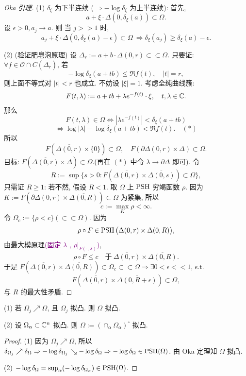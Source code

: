 \begin{proof}[Oka 引理]
    (1) $\delta _{\xi }$ 为下半连续 ($\Rightarrow -\log \delta _{\xi }$ 为上半连续): 
    首先, $$a+\xi \cdot  \Delta (0,\delta _{\xi }(a)) \subset \Omega .$$  
    设 $\epsilon >0, a_j \to a$. 
    则 当 $j>>1$ 时, 
    $$ a_j+\xi \cdot \Delta (0,\delta _{\xi }(a)-\epsilon ) \subset \Omega ~ \Rightarrow \delta _{\xi }(a_j) \geq \delta _{\xi }(a)-\epsilon .$$  

    (2) (验证肥皂泡原理) 设 $\Delta _r:=a+b \cdot \Delta (0,r) \subset \subset \Omega $. 
    只要证: $\forall f \in \mathcal{O} \cap C(\overline{\Delta} _r)$, 若 
    $$ -\log \delta _{\xi }(a+tb) \leq \Re f (t), \quad |t|=r, $$  
    则上面不等式对 $|t|<r$ 也成立. 
    不妨设 $|\xi |=1$. 考虑全纯曲线簇: 
    $$ F(t,\lambda ):=a+tb+\lambda  e^{-f(t)} \cdot  \xi , \quad t,\lambda \in {\mathbb C} .$$ 
    那么 
    $$ F(t,\lambda ) \in \Omega \iff \left| \lambda e^{-f(t)} \right| <\delta _{\xi }(a+tb)  $$
    $$\iff \log |\lambda |-\log \delta _{\xi }(a+tb)<\Re f(t). \quad (*) $$
    所以 
    $$ F \left(  \overline{\Delta (0,r)} \times \{0\} \right) \subset \Omega, \quad F \left( \partial \Delta (0,r) \times \Delta  \right) \subset \Omega .$$
    目标: $F \left( \overline{\Delta (0,r)} \times \Delta  \right) \subset \Omega $.(再在 $(*)$ 中令 $\lambda \to \partial \Delta $ 即可). 
    令 
    $$ R:=\sup \big\{s>0: F \left( \overline{\Delta (0,r) }\times \overline{\Delta (0,s)} \right)\subset \Omega \big\} ,$$
    只需证 $R \geq 1$:  若不然, 假设 $R<1$. 取 $\Omega $ 上 $\operatorname{PSH}$ 穷竭函数 $\rho $. 因为 $K:=F \left( \partial \Delta (0,r) \times \overline{\Delta (0,R)}   \right) \subset \Omega$ 为紧集, 所以 
    $$ c:=\max_{K} \rho <\infty . $$   
    令 $\Omega _c:=\{\rho <c\} (\subset \subset \Omega )$. 因为 
    $$ \rho \circ F \in \operatorname{PSH} \big( \Delta (0,r) \times \Delta (0,R) \big),$$   
    由最大模原理\textcolor{purple}{(固定 $\lambda $ , $\rho |_{F(\cdot ,\lambda )}$)}, 
    $$ \rho \circ F \leq c \quad \text{于}~  \overline{\Delta (0,r)} \times \overline{\Delta (0,R)} .$$
    于是 $F \left( \overline{\Delta (0,r)} \times \overline{\Delta (0,R)} \right) \subset \overline{\Omega}_c \subset \subset \Omega \Rightarrow \exists 0<\epsilon <<1$, s.t. $$F \left( \overline{\Delta (0,r)} \times \overline{\Delta (0,R+\epsilon )} \right) \subset \Omega,$$
     与 $R$ 的最大性矛盾.   
\end{proof}

\begin{corollary}
    (1) 若 $\Omega _j \nearrow \Omega $, 且 $\Omega _j$ 拟凸. 则 $\Omega $ 拟凸. 
    
    (2) 设 $\Omega _{\alpha } \subset {\mathbb C}^n$ 拟凸. 则 $\Omega :=\left( \cap _{\alpha } \Omega _{\alpha } \right)^{\circ }$ 拟凸.  
\end{corollary}
\begin{proof}
    (1) 因为 $\Omega _j \nearrow \Omega $, 所以  $\delta _{\Omega _j} \nearrow \delta _{\Omega }\Rightarrow -\log \delta _{\Omega _j} \searrow -\log \delta _{\Omega } \Rightarrow -\log \delta _{\Omega } \in \operatorname{PSH} (\Omega )$. 由 Oka 定理知 $\Omega $ 拟凸.  

    (2) $-\log \delta _{\Omega }=\sup_{\alpha } (-\log \delta _{\Omega _{\alpha }}) \in \operatorname{PSH}(\Omega )$. 
\end{proof}

